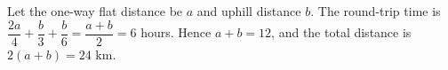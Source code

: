 Let the one-way flat distance be $a$ and uphill distance $b$. The round-trip time is $\dfrac{2a}{4}+\dfrac{b}{3}+\dfrac{b}{6}=\dfrac{a+b}{2}=6$ hours. Hence $a+b=12$, and the total distance is $2(a+b)=\boxed{24\text{ km}}$.
